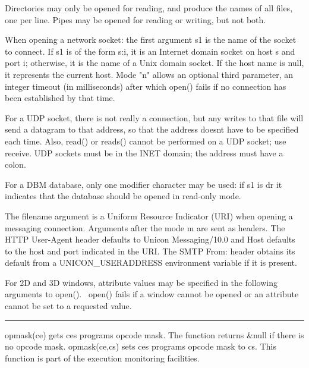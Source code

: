 Directories may only be opened for reading, and produce the names of all
files, one per line. Pipes may be opened for reading or writing, but
not both.

When opening a network socket: the first argument \textsf{s1} is the
name of the socket to connect. If \textsf{s1} is of the form
{\textquotedbl}s:i{\textquotedbl}, it is an Internet domain socket on
host s and port i; otherwise, it is the name of a Unix
domain socket. If the host name is null, it represents the current
host. Mode "n" allows an optional third parameter,
an integer timeout (in milliseconds) after which \textsf{open()} fails
if no connection has been established by that time.

For a UDP socket, there is not really a connection, but any writes to
that file will send a datagram to that address, so that the address
doesn{\textquotesingle}t have to be specified each time. Also,
\textsf{read()} or \textsf{reads()} cannot be performed on a UDP
socket; use receive. UDP sockets must be in the INET domain; the
address must have a colon. 

For a DBM database, only one modifier character may be used: if
\textsf{s1} is \textsf{{\textquotedbl}dr{\textquotedbl}} it indicates
that the database should be opened in read-only mode. 

The filename argument is a Uniform Resource Indicator (URI) when opening
a messaging connection. Arguments after the mode
{\textquotedbl}m{\textquotedbl} are sent as headers. The HTTP
User-Agent header defaults to {\textquotedbl}Unicon
Messaging/10.0{\textquotedbl} and Host defaults to the host and port
indicated in the URI. The SMTP From: header obtains its default from a
UNICON\_USERADDRESS environment variable if it is present.

For 2D and 3D windows, attribute values may be specified in the
following arguments to \textsf{open()}. \ \textsf{open()} fails if a
window cannot be opened or an attribute cannot be set to a requested
value.

\bigskip\hrule\vspace{0.1cm}

\noindent
\textsf{opmask(ce)} gets \textsf{ce}{\textquotesingle}s
program{\textquotesingle}s opcode mask. The function returns
\textsf{\&null} if there is no opcode mask. \textsf{opmask(ce,cs)} sets
\textsf{ce}{\textquotesingle}s program{\textquotesingle}s opcode mask
to \textsf{cs}. This function is part of the execution monitoring
facilities.

